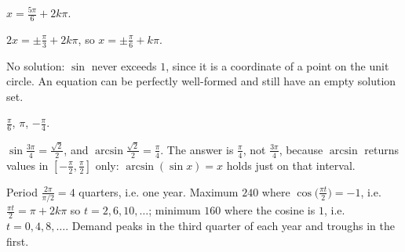 \begin{solutions}
        $x=\tfrac{5\pi}{6}+2k\pi$.
  \item $2x=\pm\tfrac{\pi}{3}+2k\pi$, so
        $x=\pm\tfrac{\pi}{6}+k\pi$.
  \item No solution: $\sin$ never exceeds $1$, since it is a coordinate of
        a point on the unit circle. An equation can be perfectly
        well-formed and still have an empty solution set.
  \item $\tfrac{\pi}{6}$, \;$\pi$, \;$-\tfrac{\pi}{4}$.
  \item $\sin\tfrac{3\pi}{4}=\tfrac{\sqrt2}{2}$, and
        $\arcsin\tfrac{\sqrt2}{2}=\tfrac{\pi}{4}$. The answer is
        $\tfrac{\pi}{4}$, not $\tfrac{3\pi}{4}$, because $\arcsin$ returns
        values in $[-\tfrac{\pi}{2},\tfrac{\pi}{2}]$ only:
        $\arcsin(\sin x)=x$ holds just on that interval.
  \item Period $\tfrac{2\pi}{\pi/2}=4$ quarters, i.e. one year. Maximum
        $240$ where $\cos\bigl(\tfrac{\pi t}{2}\bigr)=-1$, i.e.
        $\tfrac{\pi t}{2}=\pi+2k\pi$ so $t=2,6,10,\dots$; minimum $160$
        where the cosine is $1$, i.e. $t=0,4,8,\dots$. Demand peaks in the
        third quarter of each year and troughs in the first.
\end{solutions}
